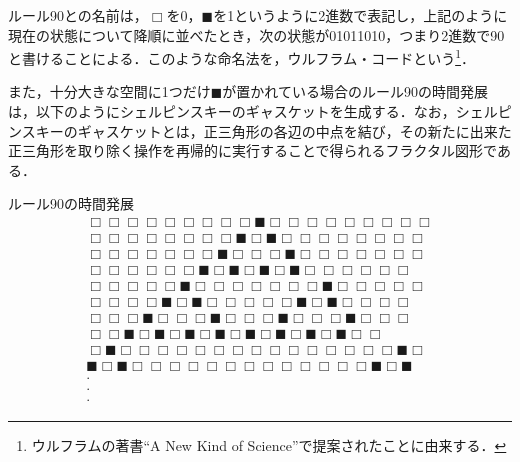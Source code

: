 \documentclass[10pt, a5paper, twoside]{ltjsarticle}
\begin{document}
            ルール90との名前は，$\Box$を0，$\blacksquare$を1というように2進数で表記し，上記のように現在の状態について降順に並べたとき，次の状態が01011010，つまり2進数で90と書けることによる．このような命名法を，ウルフラム・コードという\footnote{ウルフラムの著書``A New Kind of Science''\cite{nks}で提案されたことに由来する．}．

            また，十分大きな空間に1つだけ$\blacksquare$が置かれている場合のルール90の時間発展は，以下のようにシェルピンスキーのギャスケットを生成する．なお，シェルピンスキーのギャスケットとは，正三角形の各辺の中点を結び，その新たに出来た正三角形を取り除く操作を再帰的に実行することで得られるフラクタル図形である．

            \begin{exm}{ルール90の時間発展}{}
                \begin{gather*}
                    \Box \Box \Box \Box \Box \Box \Box \Box \Box \blacksquare \Box \Box \Box \Box \Box \Box \Box \Box \Box\\[-0.7em]
                    \Box \Box \Box \Box \Box \Box \Box \Box \blacksquare \Box \blacksquare \Box \Box \Box \Box \Box \Box \Box \Box\\[-0.7em]
                    \Box \Box \Box \Box \Box \Box \Box \blacksquare \Box \Box \Box \blacksquare \Box \Box \Box \Box \Box \Box \Box\\[-0.7em]
                    \Box \Box \Box \Box \Box \Box \blacksquare \Box \blacksquare \Box \blacksquare \Box \blacksquare \Box \Box \Box \Box \Box \Box\\[-0.7em]
                    \Box \Box \Box \Box \Box \blacksquare \Box \Box \Box \Box \Box \Box \Box \blacksquare \Box \Box \Box \Box \Box \\[-0.7em]
                    \Box \Box \Box \Box \blacksquare \Box \blacksquare \Box \Box \Box \Box \Box \blacksquare \Box \blacksquare \Box \Box \Box \Box \\[-0.7em]
                    \Box \Box \Box \blacksquare \Box \Box \Box \blacksquare \Box \Box \Box \blacksquare \Box \Box \Box \blacksquare \Box \Box \Box \\[-0.7em]
                    \Box \Box \blacksquare \Box \blacksquare \Box \blacksquare \Box \blacksquare \Box \blacksquare \Box \blacksquare \Box \blacksquare \Box \blacksquare \Box \Box \\[-0.7em]
                    \Box \blacksquare \Box \Box \Box \Box \Box \Box \Box \Box \Box \Box \Box \Box \Box \Box \Box \blacksquare \Box \\[-0.7em]
                    \blacksquare \Box \blacksquare \Box \Box \Box \Box \Box \Box \Box \Box \Box \Box \Box \Box \Box \blacksquare \Box \blacksquare \\
                    \cdot \\[-0.7em] \cdot \\[-0.7em] \cdot
                \end{gather*}
            \end{exm}
\end{document}
